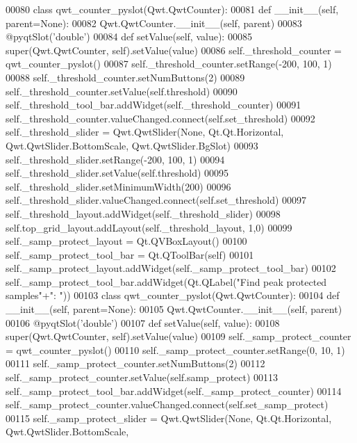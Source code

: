 \begin{DoxyCode}
00080         \textcolor{keyword}{class }qwt\_counter\_pyslot(Qwt.QwtCounter):
00081             \textcolor{keyword}{def }__init__(self, parent=None):
00082                 Qwt.QwtCounter.\_\_init\_\_(self, parent)
00083             @pyqtSlot(\textcolor{stringliteral}{'double'})
00084             \textcolor{keyword}{def }setValue(self, value):
00085                 super(Qwt.QwtCounter, self).setValue(value)
00086         self._threshold_counter = qwt\_counter\_pyslot()
00087         self.\_threshold\_counter.setRange(-200, 100, 1)
00088         self.\_threshold\_counter.setNumButtons(2)
00089         self.\_threshold\_counter.setValue(self.threshold)
00090         self.\_threshold\_tool\_bar.addWidget(self._threshold_counter)
00091         self.\_threshold\_counter.valueChanged.connect(self.set_threshold)
00092         self._threshold_slider = Qwt.QwtSlider(\textcolor{keywordtype}{None}, Qt.Qt.Horizontal, Qwt.QwtSlider.BottomScale, 
      Qwt.QwtSlider.BgSlot)
00093         self.\_threshold\_slider.setRange(-200, 100, 1)
00094         self.\_threshold\_slider.setValue(self.threshold)
00095         self.\_threshold\_slider.setMinimumWidth(200)
00096         self.\_threshold\_slider.valueChanged.connect(self.set_threshold)
00097         self.\_threshold\_layout.addWidget(self._threshold_slider)
00098         self.top\_grid\_layout.addLayout(self._threshold_layout, 1,0)
00099         self._samp_protect_layout = Qt.QVBoxLayout()
00100         self._samp_protect_tool_bar = Qt.QToolBar(self)
00101         self.\_samp\_protect\_layout.addWidget(self._samp_protect_tool_bar)
00102         self.\_samp\_protect\_tool\_bar.addWidget(Qt.QLabel(\textcolor{stringliteral}{"Find peak protected samples"}+\textcolor{stringliteral}{": "}))
00103         \textcolor{keyword}{class }qwt\_counter\_pyslot(Qwt.QwtCounter):
00104             \textcolor{keyword}{def }__init__(self, parent=None):
00105                 Qwt.QwtCounter.\_\_init\_\_(self, parent)
00106             @pyqtSlot(\textcolor{stringliteral}{'double'})
00107             \textcolor{keyword}{def }setValue(self, value):
00108                 super(Qwt.QwtCounter, self).setValue(value)
00109         self._samp_protect_counter = qwt\_counter\_pyslot()
00110         self.\_samp\_protect\_counter.setRange(0, 10, 1)
00111         self.\_samp\_protect\_counter.setNumButtons(2)
00112         self.\_samp\_protect\_counter.setValue(self.samp_protect)
00113         self.\_samp\_protect\_tool\_bar.addWidget(self._samp_protect_counter)
00114         self.\_samp\_protect\_counter.valueChanged.connect(self.set_samp_protect)
00115         self._samp_protect_slider = Qwt.QwtSlider(\textcolor{keywordtype}{None}, Qt.Qt.Horizontal, Qwt.QwtSlider.BottomScale, 

\end{DoxyCode}
